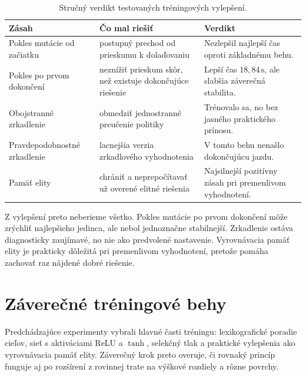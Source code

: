 \begin{table}[htbp]
    \centering
    \small
    \renewcommand{\arraystretch}{1.12}
    \caption[Verdikt tréningových vylepšení]{Stručný verdikt testovaných tréningových vylepšení.}
    \label{tab:ga_training_improvements_verdict}
    \begin{tabular}{>{\raggedright\arraybackslash}p{}
                    >{\raggedright\arraybackslash}p{}
                    >{\raggedright\arraybackslash}p{}}
        \toprule
        Zásah & Čo mal riešiť & Verdikt \\
        \midrule
        Pokles mutácie od začiatku & postupný prechod od prieskumu k dolaďovaniu & Nezlepšil najlepší čas oproti základnému behu. \\
        Pokles po prvom dokončení & neznížiť prieskum skôr, než existuje dokončujúce riešenie & Lepší čas \(18{,}84\,\mathrm{s}\), ale slabšia záverečná stabilita. \\
        Obojstranné zrkadlenie & obmedziť jednostranné preučenie politiky & Trénovalo sa, no bez jasného praktického prínosu. \\
        Pravdepodobnostné zrkadlenie & lacnejšia verzia zrkadlového vyhodnotenia & V tomto behu nenašlo dokončujúcu jazdu. \\
        Pamäť elity & chrániť a neprepočítavať už overené elitné riešenia & Najsilnejší pozitívny zásah pri premenlivom vyhodnotení. \\
        \bottomrule
    \end{tabular}
\end{table}

\FloatBarrier

Z vylepšení preto neberieme všetko. Pokles mutácie po prvom dokončení môže zrýchliť najlepšieho jedinca, ale nebol jednoznačne stabilnejší. Zrkadlenie ostáva diagnosticky zaujímavé, no nie ako predvolené nastavenie. Vyrovnávacia pamäť elity je prakticky dôležitá pri premenlivom vyhodnotení, pretože pomáha zachovať raz nájdené dobré riešenie.

\FloatBarrier

\section{Záverečné tréningové behy}

Predchádzajúce experimenty vybrali hlavné časti tréningu: lexikografické poradie cieľov, sieť s aktiváciami ReLU a \(\tanh\), selekčný tlak a praktické vylepšenia ako vyrovnávacia pamäť elity. Záverečný krok preto overuje, či rovnaký princíp funguje aj po rozšírení z rovinnej trate na výškové rozdiely a rôzne povrchy.

